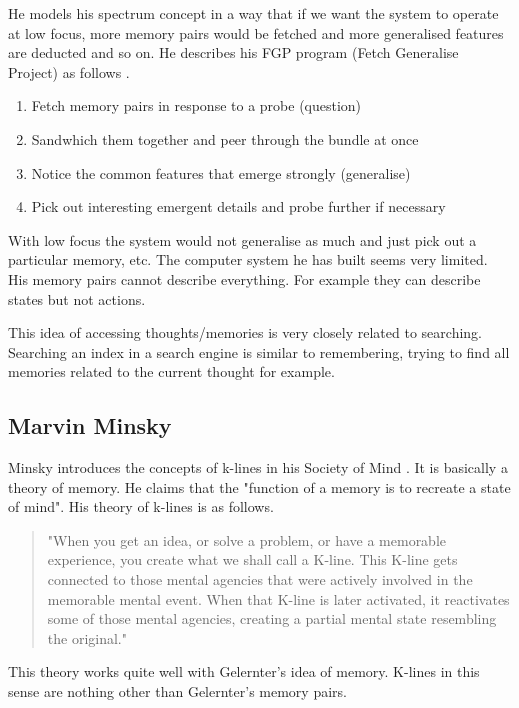 He models his spectrum concept in a way that if we want the system to operate at low focus, more memory pairs would be fetched and more generalised features are deducted and so on. He describes his FGP program (Fetch Generalise Project) as follows \citep[p.132]{Gelernter1994}.

\begin{enumerate}
  \item Fetch memory pairs in response to a probe (question)
  \item Sandwhich them together and peer through the bundle at once
  \item Notice the common features that emerge strongly (generalise)
  \item Pick out interesting emergent details and probe further if necessary
\end{enumerate}

With low focus the system would not generalise as much and just pick out a particular memory, etc. The computer system he has built seems very limited. His memory pairs cannot describe everything. For example they can describe states but not actions.

This idea of accessing thoughts/memories is very closely related to searching. Searching an index in a search engine is similar to remembering, trying to find all memories related to the current thought for example.

\subsection{Marvin Minsky}

Minsky introduces the concepts of k-lines in his Society of Mind \citep{Minsky1980, Minsky1988}. It is basically a theory of memory. He claims that the "function of a memory is to recreate a state of mind". His theory of k-lines is as follows.

\begin{quote}
  "When you get an idea, or solve a problem, or have a memorable experience, you create what we shall call a K-line. This K-line gets connected to those mental agencies that were actively involved in the memorable mental event. When that K-line is later activated, it reactivates some of those mental agencies, creating a partial mental state resembling the original."\citep{Minsky1980, Minsky1988}
\end{quote}

This theory works quite well with Gelernter's idea of memory. K-lines in this sense are nothing other than Gelernter's memory pairs.

